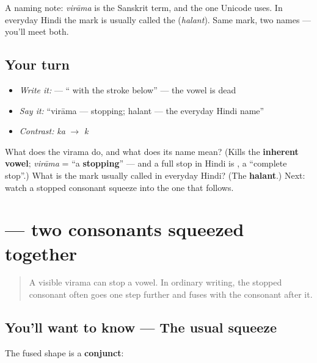 A naming note: \emph{virāma} is the Sanskrit term, and the one Unicode uses. In everyday Hindi the mark is usually called the \textbf{} (\emph{halant}). Same mark, two names — you'll meet both.

\subsection*{Your turn}
\begin{itemize}
\raggedright
  \item \emph{Write it:}  — \textquotedblleft{} with the stroke below\textquotedblright{} — the vowel is dead
  \item \emph{Say it:} \textquotedblleft{}virāma — stopping; halant — the everyday Hindi name\textquotedblright{}
  \item \emph{Contrast:}  \emph{ka} $\to$  \emph{k}
\end{itemize}

\begin{tcolorbox}[breakable,colback=teal!4,colframe=teal!35!black,title={Before you move on}]
What does the virama \textbf{} do, and what does its name mean? (Kills the \textbf{inherent vowel}; \emph{virāma} = \textquotedblleft{}a \textbf{stopping}\textquotedblright{} — and a full stop in Hindi is \textbf{ }, a \textquotedblleft{}complete stop\textquotedblright{}.) What is the mark usually called in everyday Hindi? (The \textbf{halant}.) Next: watch a stopped consonant squeeze into the one that follows.
\end{tcolorbox}
\section[\texorpdfstring{\hi{स्त} (sta)}{स्त (sta)}]{ — two consonants squeezed together}

\label{lesson:HI-W05-conjuncts}



\begin{quote}
A visible virama can stop a vowel. In ordinary writing, the stopped consonant often goes one step further and fuses with the consonant after it.
\end{quote}

\subsection*{You'll want to know — The usual squeeze}
The fused shape is a \textbf{conjunct}:

